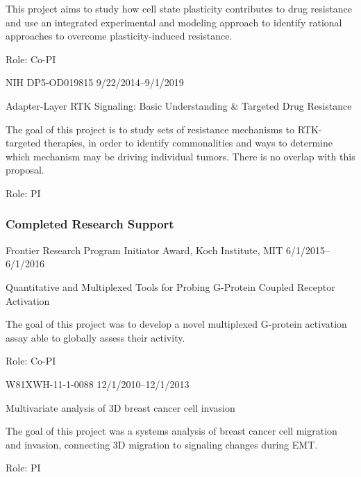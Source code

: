 \documentclass[11pt]{article}
\begin{document}
This project aims to study how cell state plasticity contributes to drug resistance and use an integrated experimental and modeling approach to identify rational approaches to overcome plasticity-induced resistance.

Role: Co-PI

\vspace{12pt}

NIH DP5-OD019815  \hfill  9/22/2014--9/1/2019

Adapter-Layer RTK Signaling: Basic Understanding \& Targeted Drug Resistance

The goal of this project is to study sets of resistance mechanisms to RTK-targeted therapies, in order to identify commonalities and ways to determine which mechanism may be driving individual tumors. There is no overlap with this proposal.

Role: PI

\subsubsection{Completed Research Support}

Frontier Research Program Initiator Award, Koch Institute, MIT \hfill 6/1/2015--6/1/2016

Quantitative and Multiplexed Tools for Probing G-Protein Coupled Receptor Activation

The goal of this project was to develop a novel multiplexed G-protein activation assay able to globally assess their activity.

Role: Co-PI

\vspace{12pt}



W81XWH-11-1-0088  \hfill  12/1/2010--12/1/2013

Multivariate analysis of 3D breast cancer cell invasion

The goal of this project was a systems analysis of breast cancer cell migration and invasion, connecting 3D migration to signaling changes during EMT.

Role: PI
\end{document}
